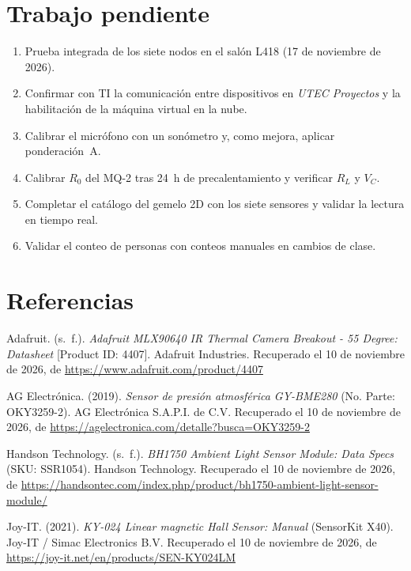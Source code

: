 \documentclass[11pt,a4paper]{article}
\begin{document}
\section{Trabajo pendiente}

\begin{enumerate}
  \item Prueba integrada de los siete nodos en el sal\'on L418 (17 de noviembre de 2026).
  \item Confirmar con TI la comunicaci\'on entre dispositivos en \emph{UTEC Proyectos} y la
        habilitaci\'on de la m\'aquina virtual en la nube.
  \item Calibrar el micr\'ofono con un son\'ometro y, como mejora, aplicar ponderaci\'on~A.
  \item Calibrar $R_0$ del MQ-2 tras 24~h de precalentamiento y verificar $R_L$ y $V_C$.
  \item Completar el cat\'alogo del gemelo 2D con los siete sensores y validar la lectura en tiempo real.
  \item Validar el conteo de personas con conteos manuales en cambios de clase.
\end{enumerate}

\section*{Referencias}
\setlength{\parindent}{-1.2em}\setlength{\leftskip}{1.2em}

Adafruit. (s.\ f.). \emph{Adafruit MLX90640 IR Thermal Camera Breakout - 55 Degree: Datasheet} [Product ID: 4407]. Adafruit Industries. Recuperado el 10 de noviembre de 2026, de \url{https://www.adafruit.com/product/4407}

AG Electr\'onica. (2019). \emph{Sensor de presi\'on atmosf\'erica GY-BME280} (No. Parte: OKY3259-2). AG Electr\'onica S.A.P.I. de C.V. Recuperado el 10 de noviembre de 2026, de \url{https://agelectronica.com/detalle?busca=OKY3259-2}

Handson Technology. (s.\ f.). \emph{BH1750 Ambient Light Sensor Module: Data Specs} (SKU: SSR1054). Handson Technology. Recuperado el 10 de noviembre de 2026, de \url{https://handsontec.com/index.php/product/bh1750-ambient-light-sensor-module/}

Joy-IT. (2021). \emph{KY-024 Linear magnetic Hall Sensor: Manual} (SensorKit X40). Joy-IT / Simac Electronics B.V. Recuperado el 10 de noviembre de 2026, de \url{https://joy-it.net/en/products/SEN-KY024LM}
\end{document}
